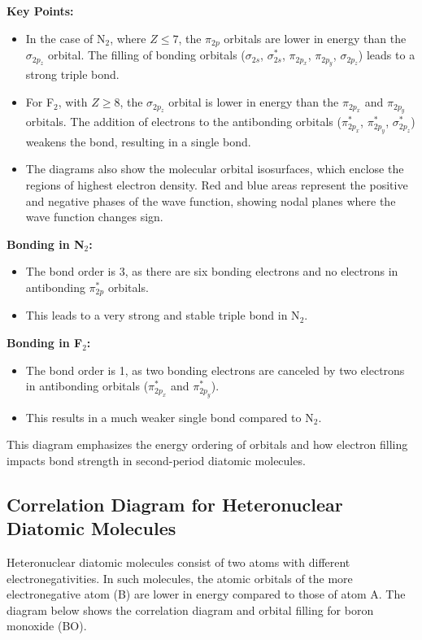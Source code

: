 \documentclass{report}
\begin{document}
\textbf{Key Points:}
\begin{itemize}
	\item In the case of N$_2$, where $Z \leq 7$, the $\pi_{2p}$ orbitals are lower in energy than the $\sigma_{2p_z}$ orbital. The filling of bonding orbitals ($\sigma_{2s}$, $\sigma^*_{2s}$, $\pi_{2p_x}$, $\pi_{2p_y}$, $\sigma_{2p_z}$) leads to a strong triple bond.

	\item For F$_2$, with $Z \geq 8$, the $\sigma_{2p_z}$ orbital is lower in energy than the $\pi_{2p_x}$ and $\pi_{2p_y}$ orbitals. The addition of electrons to the antibonding orbitals ($\pi^*_{2p_x}$, $\pi^*_{2p_y}$, $\sigma^*_{2p_z}$) weakens the bond, resulting in a single bond.

	\item The diagrams also show the molecular orbital isosurfaces, which enclose the regions of highest electron density. Red and blue areas represent the positive and negative phases of the wave function, showing nodal planes where the wave function changes sign.
\end{itemize}

\textbf{Bonding in N$_2$:}
\begin{itemize}
	\item The bond order is 3, as there are six bonding electrons and no electrons in antibonding $\pi^*_{2p}$ orbitals.
	\item This leads to a very strong and stable triple bond in N$_2$.
\end{itemize}

\textbf{Bonding in F$_2$:}
\begin{itemize}
	\item The bond order is 1, as two bonding electrons are canceled by two electrons in antibonding orbitals ($\pi^*_{2p_x}$ and $\pi^*_{2p_y}$).
	\item This results in a much weaker single bond compared to N$_2$.
\end{itemize}

This diagram emphasizes the energy ordering of orbitals and how electron filling impacts bond strength in second-period diatomic molecules.

\subsection{Correlation Diagram for Heteronuclear Diatomic Molecules}

Heteronuclear diatomic molecules consist of two atoms with different electronegativities. In such molecules, the atomic orbitals of the more electronegative atom (B) are lower in energy compared to those of atom A. The diagram below shows the correlation diagram and orbital filling for boron monoxide (BO).
\end{document}
